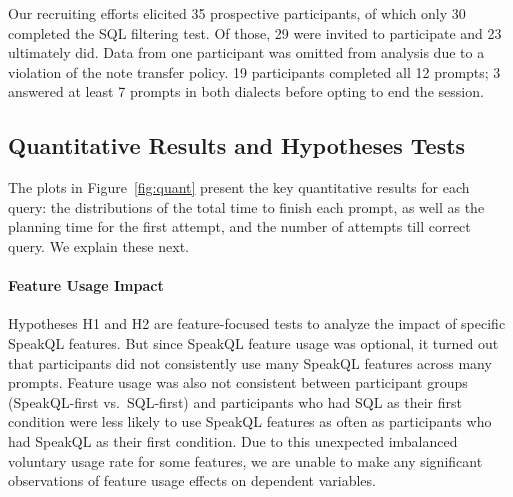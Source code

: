 Our recruiting efforts elicited 35 prospective participants, of which only 30 completed the SQL filtering test.
Of those, 29 were invited to participate and 23 ultimately did. 
Data from one participant was omitted from analysis due to a violation of the note transfer policy. 
19 participants completed all 12 prompts; 3 answered at least 7 prompts in both dialects before opting to end the session.



\subsection{Quantitative Results and Hypotheses Tests}

The plots in Figure~\ref{fig:quant} present the key quantitative results for each query: the distributions of the total time to finish each prompt, as well as the planning time for the first attempt, and the number of attempts till correct query. We explain these next. 


\paragraph{\textbf{Feature Usage Impact}} 
Hypotheses H1 and H2 are feature-focused tests to analyze the impact of specific SpeakQL features. 
But since SpeakQL feature usage was optional, it turned out that participants did not consistently use many SpeakQL features across many prompts. 
Feature usage was also not consistent between participant groups (SpeakQL-first vs.~SQL-first) and participants who had SQL as their first condition were less likely to use SpeakQL features as often as participants who had SpeakQL as their first condition. 
Due to this unexpected imbalanced voluntary usage rate for some features, we are unable to make any significant observations of feature usage effects on dependent variables. 

